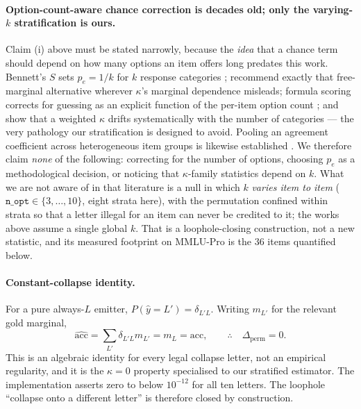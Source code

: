 \paragraph{Option-count-aware chance correction is decades old; only the varying-$k$ stratification is ours.}
Claim (i) above must be stated narrowly, because the \emph{idea} that a chance term should depend
on how many options an item offers long predates this work. Bennett's $S$ sets
$p_e=1/k$ for $k$ response categories \citep{bennett1954communications};
\citet{brennan1981kappa} recommend exactly that free-marginal alternative wherever $\kappa$'s
marginal dependence misleads; formula scoring corrects for guessing as an explicit function of the
per-item option count \citep{frary1988formula}; and \citet{brenner1996weightedkappa} show that a
weighted $\kappa$ drifts systematically with the number of categories --- the very pathology our
stratification is designed to avoid. Pooling an agreement coefficient across heterogeneous item
groups is likewise established \citep{devries2008pooledkappa}. We therefore claim \emph{none} of
the following: correcting for the number of options, choosing $p_e$ as a methodological decision,
or noticing that $\kappa$-family statistics depend on $k$. What we are not aware of in that
literature is a null in which $k$ \emph{varies item to item} ($\texttt{n\_opt}\in\{3,\dots,10\}$,
eight strata here), with the permutation confined within strata so that a letter illegal for an
item can never be credited to it; the works above assume a single global $k$. That is a
loophole-closing construction, not a new statistic, and its measured footprint on MMLU-Pro is the
$36$ items quantified below.

\paragraph{Constant-collapse identity.}
For a pure always-$L$ emitter, $P(\hat{y}=L')=\delta_{L'L}$. Writing $m_{L'}$ for the relevant gold marginal,
\begin{equation}
\widehat{\mathrm{acc}}
=\sum_{L'}\delta_{L'L}m_{L'}
=m_{L}
=\mathrm{acc},
\qquad
\therefore\quad \Delta_{\mathrm{perm}}=0.
\end{equation}
This is an algebraic identity for every legal collapse letter, not an empirical regularity, and it is the $\kappa=0$ property specialised to our stratified estimator. The implementation asserts zero to below $10^{-12}$ for all ten letters. The loophole ``collapse onto a different letter'' is therefore closed by construction.

